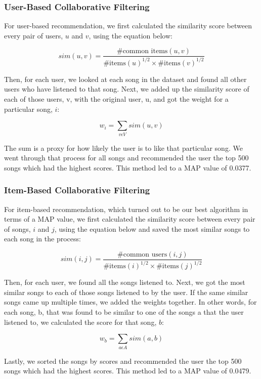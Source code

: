 \documentclass[12pt,preprint]{aastex}
\begin{document}
\subsubsection{User-Based Collaborative Filtering}
For user-based recommendation, we first calculated the similarity score between every pair of users, $u$ and $v$, using the equation below:

\begin{equation}
sim(u,v) = \frac{\text{\# common items}(u, v)}{{\text{\# items}(u)}^{1/2} \times {\text{\# items}(v)}^{1/2}}
\end{equation}

Then, for each user, we looked at each song in the dataset and found all other users who have listened to that song. Next, we added up the similarity score of each of those users, v, with the original user, u, and got the weight for a particular song, $i$:  

$$w_i = \sum_{v \epsilon V} sim(u, v)$$

The sum is a proxy for how likely the user is to like that particular song. We went through that process for all songs and recommended the user the top 500 songs which had the highest scores. This method led to a MAP value of 0.0377.

\subsubsection{Item-Based Collaborative Filtering}
For item-based recommendation, which turned out to be our best algorithm in terms of a MAP value, we first calculated the similarity score between every pair of songs, $i$ and $j$, using the equation below and saved the most similar songs to each song in the process:

\begin{equation}
sim(i,j) = \frac{\text{\# common users}(i, j)}{{\text{\# items}(i)}^{1/2} \times {\text{\# items}(j)}^{1/2}}
\end{equation}

Then, for each user, we found all the songs listened to. Next, we got the most similar songs to each of those songs listened to by the user. If the same similar songs came up multiple times, we added the weights together. In other words, for each song, b, that was found to be similar to one of the songs a that the user listened to, we calculated the score for that song, $b$:

$$w_b = \sum_{a \epsilon A} sim(a, b)$$

Lastly, we sorted the songs by scores and recommended the user the top 500 songs which had the highest scores. This method led to a MAP value of 0.0479.
\end{document}
